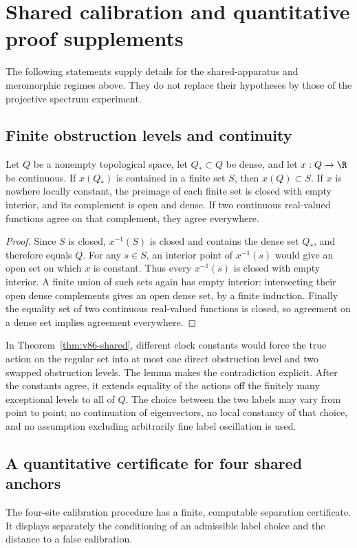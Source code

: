 \section{Shared calibration and quantitative proof supplements}
\label{sec:v87-supplements}
The following statements supply details for the shared-apparatus and
meromorphic regimes above. They do not replace their hypotheses by
those of the projective spectrum experiment.

\subsection{Finite obstruction levels and continuity}
\begin{lemma}\label{lem:v87-finite-level}
Let $Q$ be a nonempty topological space, let $Q_*\subset Q$ be dense,
and let $x:Q\to\R$ be continuous. If $x(Q_*)$ is contained in a finite
set $S$, then $x(Q)\subset S$. If $x$ is nowhere locally constant,
the preimage of each finite set is closed with empty interior, and
its complement is open and dense. If two continuous real-valued
functions agree on that complement, they agree everywhere.
\end{lemma}
\begin{proof}
Since $S$ is closed, $x^{-1}(S)$ is closed and contains the dense set
$Q_*$, and therefore equals $Q$. For any $s\in S$, an interior point
of $x^{-1}(s)$ would give an open set on which $x$ is constant.
Thus every $x^{-1}(s)$ is closed with empty interior. A finite union
of such sets again has empty interior: intersecting their open dense
complements gives an open dense set, by a finite induction.
Finally the equality set of two continuous real-valued functions is
closed, so agreement on a dense set implies agreement everywhere.
\end{proof}
In Theorem~\ref{thm:v86-shared}, different clock constants would force
the true action on the regular set into at most one direct obstruction
level and two swapped obstruction levels. The lemma makes the
contradiction explicit. After the constants agree, it extends equality
of the actions off the finitely many exceptional levels to all of $Q$.
The choice between the two labels may vary from point to point; no
continuation of eigenvectors, no local constancy of that choice, and
no assumption excluding arbitrarily fine label oscillation is used.

\subsection{A quantitative certificate for four shared anchors}
The four-site calibration procedure has a finite, computable separation
certificate. It displays separately the conditioning of an admissible
label choice and the distance to a false calibration.

